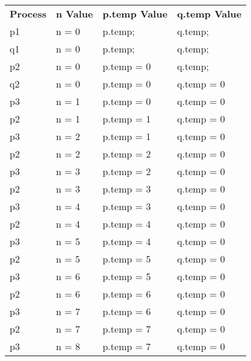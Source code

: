 \documentclass[]{article}
\begin{document}
\begin{table}[h]
\begin{tabular}{llll}
\textbf{Process} & \textbf{n Value} & \textbf{p.temp Value} & \textbf{q.temp Value} \\
p1               & n = 0            & p.temp;               & q.temp;               \\
q1               & n = 0            & p.temp;               & q.temp;               \\
p2               & n = 0            & p.temp = 0            & q.temp;               \\
q2               & n = 0            & p.temp = 0            & q.temp = 0            \\
p3               & n = 1            & p.temp = 0            & q.temp = 0            \\
p2               & n = 1            & p.temp = 1            & q.temp = 0            \\
p3               & n = 2            & p.temp = 1            & q.temp = 0            \\
p2               & n = 2            & p.temp = 2            & q.temp = 0            \\
p3               & n = 3            & p.temp = 2            & q.temp = 0            \\
p2               & n = 3            & p.temp = 3            & q.temp = 0            \\
p3               & n = 4            & p.temp = 3            & q.temp = 0            \\
p2               & n = 4            & p.temp = 4            & q.temp = 0            \\
p3               & n = 5            & p.temp = 4            & q.temp = 0            \\
p2               & n = 5            & p.temp = 5            & q.temp = 0            \\
p3               & n = 6            & p.temp = 5            & q.temp = 0            \\
p2               & n = 6            & p.temp = 6            & q.temp = 0            \\
p3               & n = 7            & p.temp = 6            & q.temp = 0            \\
p2               & n = 7            & p.temp = 7            & q.temp = 0            \\
p3               & n = 8            & p.temp = 7            & q.temp = 0            \\

\end{tabular}
\end{table}
\end{document}
